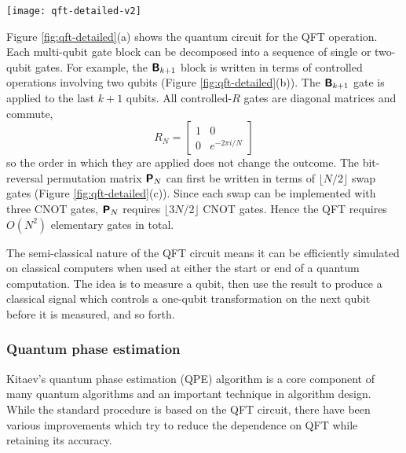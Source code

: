 \documentclass[10pt]{iopart}
\begin{document}
\begin{figure*}[ht!]
\centering
\texttt{[image: qft-detailed-v2]}
\caption{QFT operation \textbf{\textsf{F}}$_N$ on $N$ qubits. Adapted from \cite{Camps2020}.}
\label{fig:qft-detailed}
\end{figure*}

Figure \ref{fig:qft-detailed}(a) shows the quantum circuit for the QFT operation. Each multi-qubit gate block can be decomposed into a sequence of single or two-qubit gates. For example, the $\textsf{\textbf{B}}_{k+1}$ block is written in terms of controlled operations involving two qubits (Figure \ref{fig:qft-detailed}(b)). The $\textsf{\textbf{B}}_{k+1}$ gate is applied to the last $k+1$ qubits. All controlled-$R$ gates are diagonal matrices and commute,
\begin{equation}
R_N = \begin{bmatrix} 1 & 0 \\ 0 & e^{-2\pi i/N} \end{bmatrix}
\end{equation}
so the order in which they are applied does not change the outcome. The bit-reversal permutation matrix $\textsf{\textbf{P}}_N$ can first be written in terms of $\lfloor N/2 \rfloor$ swap gates (Figure \ref{fig:qft-detailed}(c)). Since each swap can be implemented with three CNOT gates, $\textsf{\textbf{P}}_N$ requires $\lfloor 3N/2 \rfloor$ CNOT gates. Hence the QFT requires $O(N^2)$ elementary gates in total.

The semi-classical nature of the QFT circuit means it can be efficiently simulated on classical computers \cite{Griffiths1996,Browne2007} when used at either the start or end of a quantum computation. The idea is to measure a qubit, then use the result to produce a classical signal which controls a one-qubit transformation on the next qubit before it is measured, and so forth.


\subsubsection{Quantum phase estimation}\label{sssec:QPE}\hfill

Kitaev's quantum phase estimation (QPE) algorithm \cite{Kitaev1996} is a core component of many quantum algorithms and an important technique in algorithm design. While the standard procedure is based on the QFT circuit, there have been various improvements \cite{Ahmadi2012} which try to reduce the dependence on QFT while retaining its accuracy.
\end{document}

